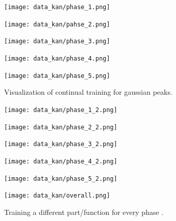 \documentclass[conference]{IEEEtran}
\begin{document}
\begin{figure}
    \centering
    \begin{minipage}{0.32\linewidth}
        \centering
        \texttt{[image: data\_kan/phase\_1.png]}
    \end{minipage}
    \begin{minipage}{0.32\linewidth}
        \centering
        \texttt{[image: data\_kan/pahse\_2.png]}
    \end{minipage}
    \begin{minipage}{0.32\linewidth}
        \centering
        \texttt{[image: data\_kan/phase\_3.png]}
    \end{minipage}

    \begin{minipage}{0.32\linewidth}
        \centering
        \texttt{[image: data\_kan/phase\_4.png]}
    \end{minipage}
    \begin{minipage}{0.32\linewidth}
        \centering
        \texttt{[image: data\_kan/phase\_5.png]}
    \end{minipage}

    \caption{Visualization of continual training for gaussian peaks.}
    \label{fig:phases}
\end{figure}

\begin{figure}
    \centering
    \begin{minipage}{0.32\linewidth}
        \centering
        \texttt{[image: data\_kan/phase\_1\_2.png]}
    \end{minipage}
    \begin{minipage}{0.32\linewidth}
        \centering
        \texttt{[image: data\_kan/phase\_2\_2.png]}
    \end{minipage}
    \begin{minipage}{0.32\linewidth}
        \centering
        \texttt{[image: data\_kan/phase\_3\_2.png]}
    \end{minipage}

    \begin{minipage}{0.32\linewidth}
        \centering
        \texttt{[image: data\_kan/phase\_4\_2.png]}
    \end{minipage}
    \begin{minipage}{0.32\linewidth}
        \centering
        \texttt{[image: data\_kan/phase\_5\_2.png]}
    \end{minipage}
    \begin{minipage}{0.32\linewidth}
        \centering
        \texttt{[image: data\_kan/overall.png]}
    \end{minipage}

    \caption{Training a different part/function for every phase . }
    \label{fig:phases_overall}
\end{figure}
\end{document}
